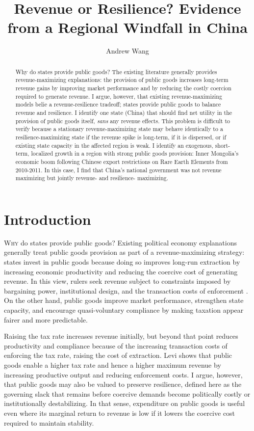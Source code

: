 \documentclass[12pt]{article}
\author[1]{Andrew Wang}
\affil[1]{University of Washington}
\title{Revenue or Resilience? Evidence from a Regional Windfall in China}
\begin{document}
\maketitle

\begin{abstract}
Why do states provide public goods? The existing literature generally provides revenue-maximizing explanations: the provision of public goods increases long-term revenue gains by improving market performance and by reducing the costly coercion required to generate revenue. I argue, however, that existing revenue-maximizing models belie a revenue-resilience tradeoff; states provide public goods to balance revenue and resilience. I identify one state (China) that should find net utility in the provision of public goods itself, \textit{sans} any revenue effects. This problem is difficult to verify because a stationary revenue-maximizing state may behave identically to a resilience-maximizing state if the revenue spike is long-term, if it is dispersed, or if existing state capacity in the affected region is weak. I identify an exogenous, short-term, localized growth in a region with strong public goods provision: Inner Mongolia's economic boom following Chinese export restrictions on Rare Earth Elements from 2010-2011. In this case, I find that China's national government was not revenue maximizing but jointly revenue- and resilience- maximizing.
\end{abstract}

\section{Introduction}

\lettrine[]{W}{hy} do states provide public goods? Existing political economy explanations generally treat public goods provision as part of a revenue-maximizing strategy: states invest in public goods because doing so improves long-run extraction by increasing economic productivity and reducing the coercive cost of generating revenue. In this view, rulers seek revenue subject to constraints imposed by bargaining power, institutional design, and the transaction costs of enforcement \parencite{levi1988}. On the other hand, public goods improve market performance, strengthen state capacity, and encourage quasi-voluntary compliance by making taxation appear fairer and more predictable.

Raising the tax rate increases revenue initially, but beyond that point reduces productivity and compliance because of the increasing transaction costs of enforcing the tax rate, raising the cost of extraction. Levi shows that public goods enable a higher tax rate and hence a higher maximum revenue by increasing productive output and reducing enforcement costs. I argue, however, that public goods may also be valued to preserve resilience, defined here as the governing slack that remains before coercive demands become politically costly or institutionally destabilizing. In that sense, expenditure on public goods is useful even where its marginal return to revenue is low if it lowers the coercive cost required to maintain stability.
\end{document}
